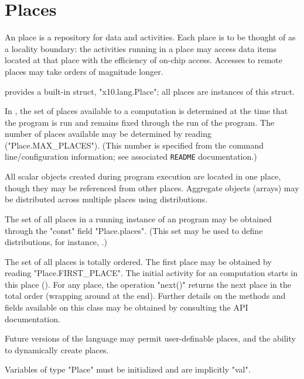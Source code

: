 \chapter{Places}\label{XtenPlaces}

An \Xten{} place is a repository for data and activities. Each place
is to be thought of as a locality boundary: the activities running in
a place may access data items located at that place with the
efficiency of on-chip access. Accesses to remote places may take
orders of magnitude longer.

{}\Xten{} provides a built-in struct, \xcd"x10.lang.Place"; all
places are instances of this struct. 

In \XtenCurrVer{}, the set of places available to a computation is
determined at the time that the program is run and remains fixed
through the run of the program. The number of places available 
may be determined by reading (\xcd"Place.MAX_PLACES"). (This number
is specified from the command line/configuration information; 
see associated {\tt README} documentation.)

All scalar objects created during program execution are located in one
place, though they may be referenced from other places. Aggregate
objects (arrays) may be distributed across multiple places using
distributions.

The set of all places in a running instance of an \Xten{} program may
be obtained through the \xcd"const" field \xcd"Place.places".  (This
set may be used to define distributions, for instance,
.) 


The set of all places is totally ordered.  The first place may be
obtained by reading \xcd"Place.FIRST_PLACE". The initial activity for
an \Xten{} computation starts in this place
(). For any place, the operation \xcd"next()"
returns the next place in the total order (wrapping around at the
end). Further details on the methods and fields available on this
class may be obtained by consulting the API documentation.

\begin{note}
Future versions of the language may permit user-definable
places, and the ability to dynamically create places.
\end{note}

\begin{staticrule*}
Variables of type \xcd"Place" must be initialized and are implicitly
\xcd"val".  
\end{staticrule*}

